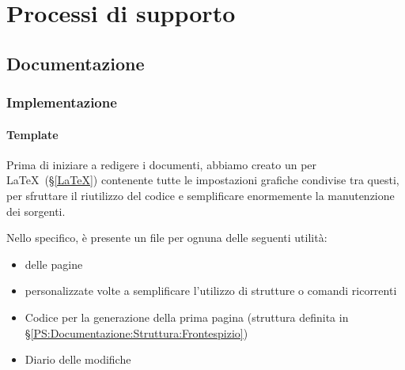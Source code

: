 
\section{Processi di supporto}\label{PS}

	\subsection{Documentazione}\label{PS:Documentazione}

		\subsubsection{Implementazione}\label{PS:Documentazione:Implementazione}

			\paragraph{Template}\label{PS:Documentazione:Implementazione:Template}
			Prima di iniziare a redigere i documenti, abbiamo creato un  per \LaTeX \ (\S\ref{LaTeX}) contenente tutte le impostazioni grafiche
			condivise tra questi, per sfruttare il riutilizzo del codice e semplificare enormemente la manutenzione dei sorgenti.\par
			Nello specifico, è presente un file per ognuna delle seguenti utilità:
			\begin{itemize}
				\item {} delle pagine
				\item {} personalizzate volte a semplificare l'utilizzo di strutture o comandi ricorrenti
				\item Codice per la generazione della prima pagina
					(struttura definita in \S\ref{PS:Documentazione:Struttura:Frontespizio})
				\item Diario delle modifiche
			\end{itemize}

